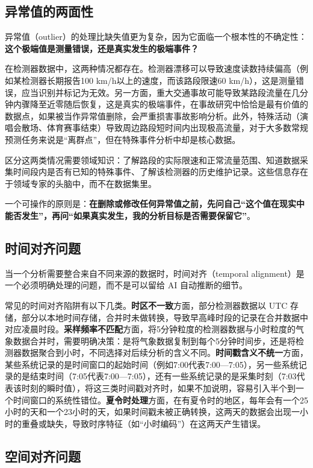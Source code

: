 \subsection{异常值的两面性}

异常值（outlier）的处理比缺失值更为复杂，因为它面临一个根本性的不确定性：\textbf{这个极端值是测量错误，还是真实发生的极端事件？}

在检测器数据中，这两种情况都存在。检测器漂移可以导致速度读数持续偏高（例如某检测器长期报告100 km/h以上的速度，而该路段限速60 km/h），这是测量错误，应当识别并标记为无效。另一方面，重大交通事故可能导致某路段流量在几分钟内骤降至近零随后恢复，这是真实的极端事件，在事故研究中恰恰是最有价值的数据点，如果被当作异常值删除，会严重损害事故影响分析。此外，特殊活动（演唱会散场、体育赛事结束）导致周边路段短时间内出现极高流量，对于大多数常规预测任务来说是“离群点”，但在特殊事件分析中却是核心数据。

区分这两类情况需要领域知识：了解路段的实际限速和正常流量范围、知道数据采集时间段内是否有已知的特殊事件、了解该检测器的历史维护记录。这些信息存在于领域专家的头脑中，而不在数据集里。

一个可操作的原则是：\textbf{在删除或修改任何异常值之前，先问自己“这个值在现实中能否发生”，再问“如果真实发生，我的分析目标是否需要保留它”}。

\subsection{时间对齐问题}

当一个分析需要整合来自不同来源的数据时，时间对齐（temporal alignment）是一个必须明确处理的问题，而不是可以留给 AI 自动推断的细节。

常见的时间对齐陷阱有以下几类。\textbf{时区不一致}方面，部分检测器数据以 UTC 存储，部分以本地时间存储，合并时未做转换，导致早高峰时段的记录在合并数据中对应凌晨时段。\textbf{采样频率不匹配}方面，将5分钟粒度的检测器数据与小时粒度的气象数据合并时，需要明确决策：是将气象数据复制到每个5分钟时间步，还是将检测器数据聚合到小时，不同选择对后续分析的含义不同。\textbf{时间戳含义不统一}方面，某些系统记录的是时间窗口的起始时间（例如7:00代表7:00—7:05），另一些系统记录的是结束时间（7:05代表7:00—7:05），还有一些系统记录的是采集时刻（7:03代表该时刻的瞬时值），将这三类时间戳对齐时，如果不加说明，容易引入半个到一个时间窗口的系统性错位。\textbf{夏令时处理}方面，在有夏令时的地区，每年会有一个25小时的天和一个23小时的天，如果时间戳未被正确转换，这两天的数据会出现一小时的重叠或缺失，导致时序特征（如“小时编码”）在这两天产生错误。

\subsection{空间对齐问题}

